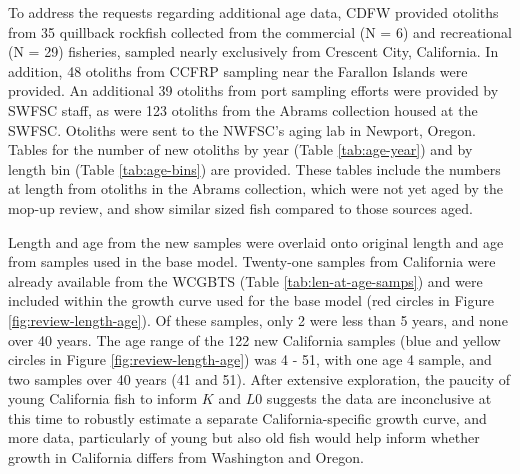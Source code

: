 \documentclass[11pt,
  english,
  a4paper,
]{article}
\begin{document}
\leavevmode\tagmcend\tagstructend\par


To address the requests regarding additional age data, CDFW provided otoliths from 35 quillback rockfish collected from the commercial (N = 6) and recreational (N = 29) fisheries, sampled nearly exclusively from Crescent City, California. In addition, 48 otoliths from CCFRP sampling near the Farallon Islands were provided. An additional 39 otoliths from port sampling efforts were provided by SWFSC staff, as were 123 otoliths from the Abrams collection housed at the SWFSC. Otoliths were sent to the NWFSC's aging lab in Newport, Oregon. Tables for the number of new otoliths by year (Table \ref{tab:age-year}) and by length bin (Table \ref{tab:age-bins}) are provided. These tables include the numbers at length from otoliths in the Abrams collection, which were not yet aged by the mop-up review, and show similar sized fish compared to those sources aged.

\leavevmode\tagmcend\tagstructend\par


Length and age from the new samples were overlaid onto original length and age from samples used in the base model. Twenty-one samples from California were already available from the WCGBTS (Table \ref{tab:len-at-age-samps}) and were included within the growth curve used for the base model (red circles in Figure \ref{fig:review-length-age}). Of these samples, only 2 were less than 5 years, and none over 40 years. The age range of the 122 new California samples (blue and yellow circles in Figure \ref{fig:review-length-age}) was 4 - 51, with one age 4 sample, and two samples over 40 years (41 and 51). After extensive exploration, the paucity of young California fish to inform {\(K\)\leavevmode\tagmcend\tagstructend} and {\(L0\)\leavevmode\tagmcend\tagstructend} suggests the data are inconclusive at this time to robustly estimate a separate California-specific growth curve, and more data, particularly of young but also old fish would help inform whether growth in California differs from Washington and Oregon.

\leavevmode\tagmcend\tagstructend\par

\end{document}
